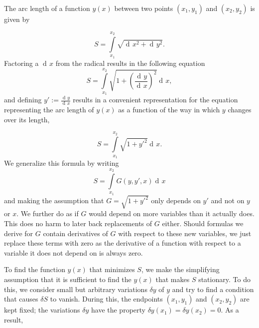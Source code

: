 \documentclass[prb,preprint]{revtex4-1}
\DeclareMathOperator{\dd}{d\!}
\begin{document}
The arc length of a function $y(x)$ between two points $(x_1,y_1)$ and $(x_2,y_2)$ is given by

\begin{equation}
S=\int\limits_{x_1}^{x_2}\sqrt{\dd x^2 + \dd y^2}.
\end{equation}
Factoring a $\dd x$ from the radical results in the following equation
\begin{equation}
S= \int\limits_{x_1}^{x_2}\sqrt{1 + \left(\frac{\dd y}{\dd x}\right)^2} \dd x,
\end{equation}
and defining $y' := \frac{\dd y}{\dd x}$ results in a convenient representation for the equation representing the arc length of $y(x)$ as a function of the way in which $y$ changes over its length, %

\begin{equation}
S = \int\limits_{x_1}^{x_2}\sqrt{1 + y'^2} \dd x.
\end{equation}
We generalize this formula by writing
\begin{equation}
S=\int\limits_{x_1}^{x_2} G(y,y',x) \dd x
\end{equation}
and making the assumption that $G = \sqrt{1 + y'^2}$ only depends on $y'$ and not on $y$ or $x$. We further do as if $G$ would depend on more variables than it actually does. This does no harm to later back replacements of $G$ either. Should formulas we derive for $G$ contain derivatives of $G$ with respect to these new variables, we just replace these terms with zero as the derivative of a function with respect to a variable it does not depend on is always zero. %

To find the function $y(x)$ that minimizes $S$, we make the simplifying assumption that it is sufficient to find the $y(x)$ that makes $S$ stationary. To do this, we consider small but arbitrary variations $\delta y$ of $y$ and try to find a condition that causes $\delta S$ to vanish. During this, the endpoints $(x_1,y_1)$ and $(x_2,y_2)$ are kept fixed; the variations $\delta y$ have the property $\delta y(x_1) = \delta y(x_2) = 0$. As a result,
\end{document}
